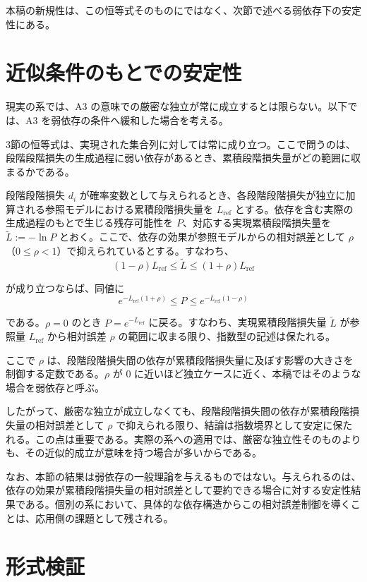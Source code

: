 \documentclass[12pt,a4paper]{article}
\begin{document}
本稿の新規性は、この恒等式そのものにではなく、次節で述べる弱依存下の安定性にある。

\section{近似条件のもとでの安定性}\label{ux8fd1ux4f3cux6761ux4ef6ux306eux3082ux3068ux3067ux306eux5b89ux5b9aux6027}

現実の系では、A3 の意味での厳密な独立が常に成立するとは限らない。以下では、A3 を弱依存の条件へ緩和した場合を考える。

3節の恒等式は、実現された集合列に対しては常に成り立つ。ここで問うのは、段階段階損失の生成過程に弱い依存があるとき、累積段階損失量がどの範囲に収まるかである。

段階段階損失 \(d_i\) が確率変数として与えられるとき、各段階段階損失が独立に加算される参照モデルにおける累積段階損失量を \(L_{\text{ref}}\) とする。依存を含む実際の生成過程のもとで生じる残存可能性を \(P\)、対応する実現累積段階損失量を \(\tilde{L} := -\ln P\) とおく。ここで、依存の効果が参照モデルからの相対誤差として \(\rho\)（\(0 \le \rho < 1\)）で抑えられているとする。すなわち、 \[
(1-\rho)L_{\text{ref}} \le \tilde{L} \le (1+\rho)L_{\text{ref}}
\]

が成り立つならば、同値に \[
e^{-L_{\text{ref}}(1+\rho)} \le P \le e^{-L_{\text{ref}}(1-\rho)}
\]

である。\(\rho = 0\) のとき \(P = e^{-L_{\text{ref}}}\) に戻る。すなわち、実現累積段階損失量 \(\tilde{L}\) が参照量 \(L_{\text{ref}}\) から相対誤差 \(\rho\) の範囲に収まる限り、指数型の記述は保たれる。

ここで \(\rho\) は、段階段階損失間の依存が累積段階損失量に及ぼす影響の大きさを制御する定数である。\(\rho\) が 0 に近いほど独立ケースに近く、本稿ではそのような場合を弱依存と呼ぶ。

したがって、厳密な独立が成立しなくても、段階段階損失間の依存が累積段階損失量の相対誤差として \(\rho\) で抑えられる限り、結論は指数境界として安定に保たれる。この点は重要である。実際の系への適用では、厳密な独立性そのものよりも、その近似的成立が意味を持つ場合が多いからである。

なお、本節の結果は弱依存の一般理論を与えるものではない。与えられるのは、依存の効果が累積段階損失量の相対誤差として要約できる場合に対する安定性結果である。個別の系において、具体的な依存構造からこの相対誤差制御を導くことは、応用側の課題として残される。

\section{形式検証}\label{ux5f62ux5f0fux691cux8a3c}
\end{document}
